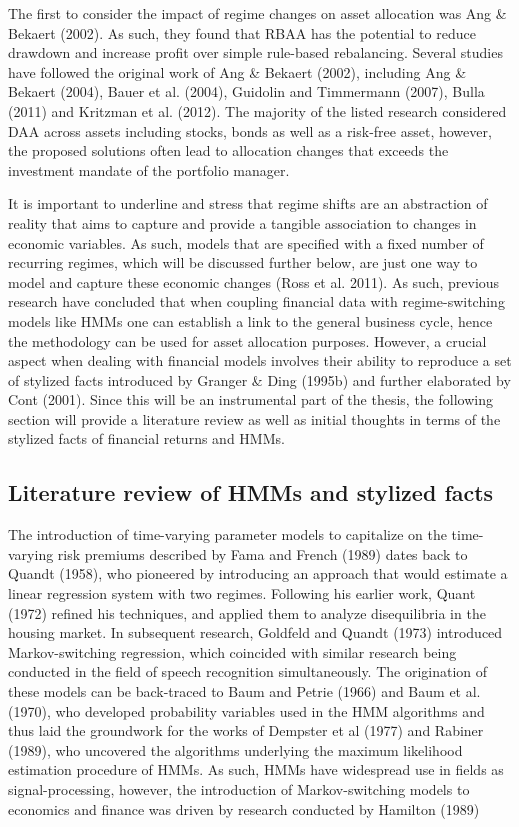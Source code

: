 The first to consider the impact of regime changes on asset allocation was Ang \& Bekaert (2002). As such, they found that RBAA has the potential to reduce drawdown and increase profit over simple rule-based rebalancing. Several studies have followed the original work of Ang \& Bekaert (2002), including Ang \& Bekaert (2004), Bauer et al.
(2004), Guidolin and Timmermann (2007), Bulla (2011) and Kritzman et al. (2012). The majority of the listed research considered DAA across assets including stocks, bonds as well as a risk-free asset, however, the proposed solutions often lead to allocation changes that exceeds the investment mandate of the portfolio manager. 

It is important to underline and stress that regime shifts are an abstraction of reality that aims to capture and provide a tangible association to changes in economic variables. As such, models that are specified with a fixed number of recurring regimes, which will be discussed further below, are just one way to model and capture these economic changes (Ross et al. 2011). As such, previous research have concluded that when coupling financial data with regime-switching models like HMMs one can establish a link to the general business cycle, hence the methodology can be used for asset allocation purposes. However, a crucial aspect when dealing with financial models involves their ability to reproduce a set of stylized facts introduced by Granger \& Ding (1995b) and further elaborated by Cont (2001). Since this will be an instrumental part of the thesis, the following section will provide a literature review as well as initial thoughts in terms of the stylized facts of financial returns and HMMs.


\subsection{Literature review of HMMs and stylized facts }
The introduction of time-varying parameter models to capitalize on the time-varying risk premiums described by Fama and French (1989) dates back to Quandt (1958), who pioneered by introducing an approach that would estimate a linear regression system with two regimes. Following his earlier work, Quant (1972) refined his techniques, and applied them to analyze disequilibria in the housing market. In subsequent research, Goldfeld and Quandt (1973) introduced Markov-switching regression, which coincided with similar research being conducted in the field of speech recognition simultaneously. The origination of these models can be back-traced to Baum and Petrie (1966) and Baum et al. (1970), who developed probability variables used in the HMM algorithms and thus laid the groundwork for the works of Dempster et al (1977) and Rabiner (1989), who uncovered the algorithms underlying the maximum likelihood estimation procedure of HMMs. As such, HMMs have widespread use in fields as signal-processing, however, the introduction of Markov-switching models to economics and finance was driven by research conducted by Hamilton (1989)

